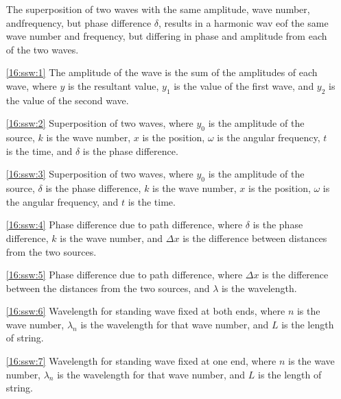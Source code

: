 \documentclass{subfile}
\begin{document}
\begin{enumerate}
  \item []The superposition of two waves with the same amplitude, wave number, andfrequency, but phase difference $\delta$, results in a harmonic wav eof the same wave number and frequency, but differing in phase and amplitude from each of the two waves.
	\item[\eqref{16:ssw:1}] The amplitude of the wave is the sum of the amplitudes of each wave, where $y$ is the resultant value, $y_{1}$ is the value of the first wave, and $y_{2}$ is the value of the second wave.
	\item[\eqref{16:ssw:2}] Superposition of two waves, where $y_{0}$ is the amplitude of the source, $k$ is the wave number, $x$ is the position, $\omega$ is the angular frequency, $t$ is the time, and $\delta$ is the phase difference.
	\item[\eqref{16:ssw:3}] Superposition of two waves, where $y_{0}$ is the amplitude of the source, $\delta$ is the phase difference, $k$ is the wave number, $x$ is the position, $\omega$ is the angular frequency, and $t$ is the time.
	\item[\eqref{16:ssw:4}] Phase difference due to path difference, where $\delta$ is the phase difference, $k$ is the wave number, and $\Delta x$ is the difference between distances from the two sources. 
	\item[\eqref{16:ssw:5}] Phase difference due to path difference, where $\Delta x$ is the difference between the distances from the two sources, and $\lambda$ is the wavelength.
	\item[\eqref{16:ssw:6}] Wavelength for standing wave fixed at both ends, where $n$ is the wave number, $\lambda_{n}$ is the wavelength for that wave number, and $L$ is the length of string.
	\item[\eqref{16:ssw:7}] Wavelength for standing wave fixed at one end, where $n$ is the wave number, $\lambda_{n}$ is the wavelength for that wave number, and $L$ is the length of string. 
\end{enumerate}
\end{document}
